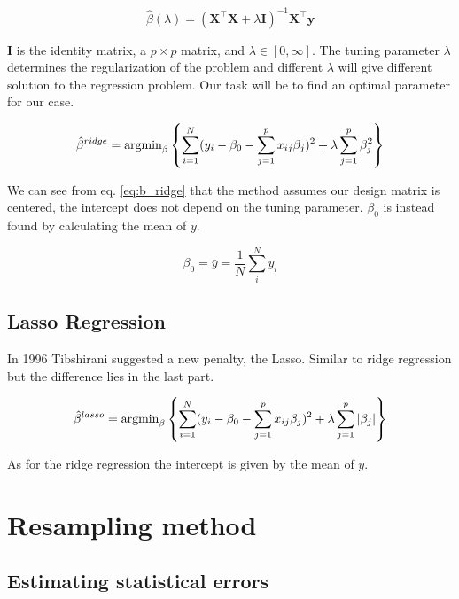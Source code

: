 \documentclass[a4paper,12pt, english]{article}
\begin{document}
\begin{equation} \label{eq:beta}
\hat{\beta}(\lambda) = (\mathbf{X}^{\top}\mathbf{X} + \lambda\mathbf{I})^{-1}\mathbf{X}^{\top}\mathbf{y}
\end{equation}

$\mathbf{I}$ is the identity matrix, a $p \times p$ matrix, and $\lambda \in [0, \infty]$. The tuning parameter $\lambda$ determines the regularization of the problem and different $\lambda$ will give different solution to the regression problem. Our task will be to find an optimal parameter for our case.

\begin{equation} \label{eq:b_ridge}
\hat{\beta}^{ridge} = \textnormal{argmin}_{\beta} \left \{ \sum_{i=1}^{N} (y_i - \beta_0 - \sum_{j=1}^{p} x_{ij} \beta_j)^2 + \lambda \sum_{j=1}^{p} \beta_j^2 \right \}
\end{equation}

We can see from eq. \ref{eq:b_ridge} that the method assumes our design matrix is centered, the intercept does not depend on the tuning parameter. $\beta_0$ is instead found by calculating the mean of $y$.

\begin{equation} \label{y_mean}
\beta_0 = \bar{y} = \frac{1}{N} \sum_i^N y_i
\end{equation}

\subsection*{Lasso Regression}

In 1996 Tibshirani suggested a new penalty, the Lasso. Similar to ridge regression but the difference lies in the last part.  

\begin{equation}
\hat{\beta}^{lasso} = \textnormal{argmin}_{\beta} \left \{ \sum_{i=1}^{N} (y_i - \beta_0 - \sum_{j=1}^{p} x_{ij} \beta_j)^2 + \lambda \sum_{j=1}^{p} |\beta_j| \right \}
\end{equation}

As for the ridge regression the intercept is given by the mean of $y$.

\section*{Resampling method}

\subsection*{Estimating statistical errors}
\end{document}
